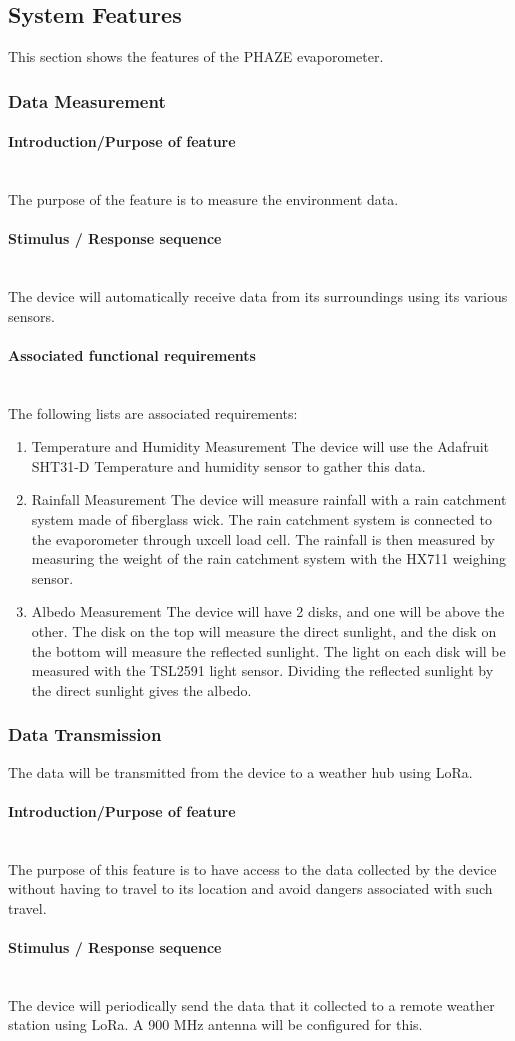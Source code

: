 \documentclass[onecolumn, draftclsnofoot,10pt, compsoc]{IEEEtran}
\newcommand{\subsubsubsection}[1]{\paragraph{#1}\mbox{}\\}
\begin{document}
\subsection{System Features}
This section shows the features of the PHAZE evaporometer.

\subsubsection{Data Measurement}

\subsubsubsection{Introduction/Purpose of feature}
The purpose of the feature is to measure the environment data. 
\subsubsubsection{Stimulus / Response sequence}
The device will automatically receive data from its surroundings using its various sensors. 
\subsubsubsection{Associated functional requirements}
The following lists are associated requirements:
\begin{enumerate}
\item Temperature and Humidity Measurement
\newline
The device will use the Adafruit SHT31-D Temperature and humidity sensor to gather this data.
\item Rainfall Measurement
\newline
The device will measure rainfall with a rain catchment system made of fiberglass wick. The rain catchment system is connected to the evaporometer through uxcell load cell. The rainfall is then measured by measuring the weight of the rain catchment system with the HX711 weighing sensor.
\item Albedo Measurement
\newline
The device will have 2 disks, and one will be above the other. The disk on the top will measure the direct sunlight, and the disk on the bottom will measure the reflected sunlight. The light on each disk will be measured with the TSL2591 light sensor. Dividing the reflected sunlight by the direct sunlight gives the albedo.
\end{enumerate}
\subsubsection{Data Transmission}
The data will be transmitted from the device to a weather hub using LoRa.
\subsubsubsection{Introduction/Purpose of feature}
The purpose of this feature is to have access to the data collected by the device without having to travel to its location and avoid dangers associated with such travel.
\subsubsubsection{Stimulus / Response sequence}
The device will periodically send the data that it collected to a remote weather station using LoRa. A 900 MHz antenna will be configured for this.
\end{document}
